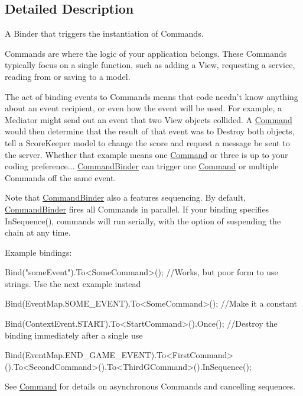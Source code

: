 \subsection{Detailed Description}
A Binder that triggers the instantiation of Commands. 

Commands are where the logic of your application belongs. These Commands typically focus on a single function, such as adding a View, requesting a service, reading from or saving to a model.

The act of binding events to Commands means that code needn't know anything about an event recipient, or even how the event will be used. For example, a Mediator might send out an event that two View objects collided. A \hyperlink{classstrange_1_1extensions_1_1command_1_1impl_1_1_command}{Command} would then determine that the result of that event was to Destroy both objects, tell a Score\-Keeper model to change the score and request a message be sent to the server. Whether that example means one \hyperlink{classstrange_1_1extensions_1_1command_1_1impl_1_1_command}{Command} or three is up to your coding preference... \hyperlink{classstrange_1_1extensions_1_1command_1_1impl_1_1_command_binder}{Command\-Binder} can trigger one \hyperlink{classstrange_1_1extensions_1_1command_1_1impl_1_1_command}{Command} or multiple Commands off the same event.

Note that \hyperlink{classstrange_1_1extensions_1_1command_1_1impl_1_1_command_binder}{Command\-Binder} also a features sequencing. By default, \hyperlink{classstrange_1_1extensions_1_1command_1_1impl_1_1_command_binder}{Command\-Binder} fires all Commands in parallel. If your binding specifies {\ttfamily In\-Sequence()}, commands will run serially, with the option of suspending the chain at any time.

Example bindings\-: \begin{DoxyVerb}Bind("someEvent").To<SomeCommand>(); //Works, but poor form to use strings. Use the next example instead

Bind(EventMap.SOME_EVENT).To<SomeCommand>(); //Make it a constant

Bind(ContextEvent.START).To<StartCommand>().Once(); //Destroy the binding immediately after a single use

Bind(EventMap.END_GAME_EVENT).To<FirstCommand>().To<SecondCommand>().To<ThirdGCommand>().InSequence();
\end{DoxyVerb}


See \hyperlink{classstrange_1_1extensions_1_1command_1_1impl_1_1_command}{Command} for details on asynchronous Commands and cancelling sequences. 

